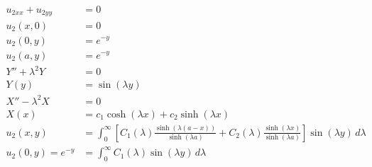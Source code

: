 \documentclass[../../HW08.tex]{subfiles}
\begin{document}
\begin{align*}
    u_{2xx}+u_{2yy}                 & = 0                                                                                                                                                                                                    \\
    u_{2}(x,0)                      & = 0                                                                                                                                                                                                    \\
    u_{2}(0,y)                      & = e^{-y}                                                                                                                                                                                               \\
    u_{2}(a,y)                      & = e^{-y}                                                                                                                                                                                               \\
    Y'' + \lambda^{2}Y              & = 0                                                                                                                                                                                                    \\
    Y(y)                            & = \sin(\lambda y)                                                                                                                                                                                      \\
    X'' - \lambda^{2}X              & = 0                                                                                                                                                                                                    \\
    X(x)                            & = c_{1}\cosh(\lambda x) + c_{2}\sinh(\lambda x)                                                                                                                                                        \\
    u_{2}(x,y)                      & = \int_{0}^{\infty} \left[ C_{1}(\lambda) \frac{\sinh(\lambda(a-x))}{\sinh(\lambda a)} + C_{2}(\lambda)\frac{\sinh(\lambda x)}{\sinh(\lambda a)} \right]\sin( \lambda y )\, d\lambda                   \\
    u_{2}(0,y) = e^{-y}             & = \int_{0}^{\infty} C_{1}(\lambda)\sin(\lambda y)\,d\lambda                                                                                                                                            \\

\end{align*}
\end{document}
